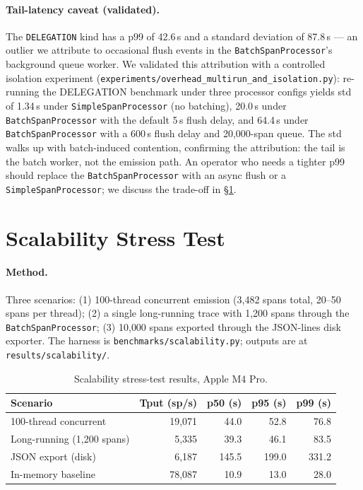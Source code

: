 \documentclass[sigplan,10pt,anonymous,review]{acmart}
\begin{document}
\paragraph{Tail-latency caveat (validated).} The \texttt{DELEGATION}
kind has a p99 of 42.6\,\textmu{}s and a standard deviation of
87.8\,\textmu{}s --- an outlier we attribute to occasional flush
events in the \texttt{BatchSpanProcessor}'s background queue worker.
We validated this attribution with a controlled isolation experiment
(\texttt{experiments/overhead\_multirun\_and\_isolation.py}):
re-running the DELEGATION benchmark under three processor configs
yields std of 1.34\,\textmu{}s under \texttt{SimpleSpanProcessor}
(no batching), 20.0\,\textmu{}s under \texttt{BatchSpanProcessor}
with the default 5\,s flush delay, and 64.4\,\textmu{}s under
\texttt{BatchSpanProcessor} with a 600\,s flush delay and 20{,}000-span
queue. The std walks up with batch-induced contention, confirming the
attribution: the tail is the batch worker, not the emission path. An
operator who needs a tighter p99 should replace the
\texttt{BatchSpanProcessor} with an async flush or a
\texttt{SimpleSpanProcessor}; we discuss the trade-off in
\S\ref{sec:scalability}.

\section{Scalability Stress Test}
\label{sec:scalability}

\paragraph{Method.} Three scenarios: (1) 100-thread concurrent
emission (3{,}482 spans total, 20--50 spans per thread); (2) a single
long-running trace with 1{,}200 spans through the
\texttt{BatchSpanProcessor}; (3) 10{,}000 spans exported through the
JSON-lines disk exporter. The harness is
\texttt{benchmarks/scalability.py}; outputs are at
\texttt{results/scalability/}.

\begin{table}[t]
\centering
\small
\caption{Scalability stress-test results, Apple M4 Pro.}
\label{tab:scalability}
\begin{tabular}{@{}lrrrr@{}}
\toprule
\textbf{Scenario} & \textbf{Tput (sp/s)}
  & \textbf{p50 (\textmu{}s)} & \textbf{p95 (\textmu{}s)}
  & \textbf{p99 (\textmu{}s)} \\
\midrule
100-thread concurrent       & 19{,}071 & 44.0 & 52.8 & 76.8 \\
Long-running (1{,}200 spans)& 5{,}335  & 39.3 & 46.1 & 83.5 \\
JSON export (disk)          & 6{,}187  & 145.5 & 199.0 & 331.2 \\
In-memory baseline          & 78{,}087 & 10.9 & 13.0 & 28.0 \\
\bottomrule
\end{tabular}
\end{table}
\end{document}
